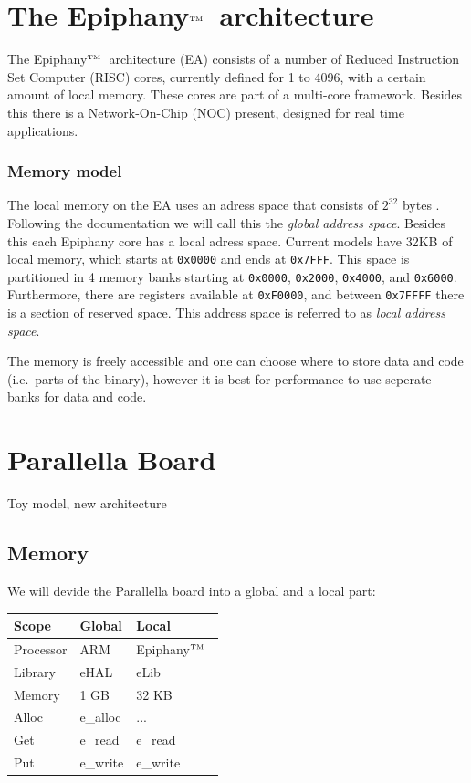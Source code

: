 \documentclass[fleqn]{article}
\renewcommand{\(}{\left(}
\renewcommand{\)}{\right)}
\def\tm{$^{\hbox{\tiny TM}}$~}
\begin{document}
\section{The Epiphany\tm architecture}

The Epiphany\tm architecture (EA) consists of a number of Reduced Instruction Set Computer (RISC) cores, currently defined for 1 to 4096, with a certain amount of local memory. These cores are part of a multi-core framework. Besides this there is a Network-On-Chip (NOC) present, designed for real time applications. 

\subsubsection{Memory model}

The local memory on the EA uses an adress space that consists of $2^{32}$ bytes \cite{ep:sdkdoc}. Following the documentation we will call this the \emph{global address space}. Besides this each Epiphany core has a local adress space. Current models have 32KB of local memory, which starts at \texttt{0x0000} and ends at \texttt{0x7FFF}. This space is partitioned in 4 memory banks starting at \texttt{0x0000}, \texttt{0x2000}, \texttt{0x4000}, and \texttt{0x6000}. Furthermore, there are registers available at \texttt{0xF0000}, and between \texttt{0x7FFFF} there is a section of reserved space. This address space is referred to as \emph{local address space}.



The memory is freely accessible and one can choose where to store data and code (i.e.\ parts of the binary), however it is best for performance to use seperate banks for data and code.

\section{Parallella Board}

Toy model, new architecture

\subsection{Memory}

We will devide the Parallella board into a global and a local part:

\begin{tabular}{l|ll}
Scope & Global & Local \\
\hline
Processor & ARM & Epiphany\tm \\
Library & eHAL & eLib \\
Memory & 1 GB & 32 KB \\
Alloc & e\_alloc & ... \\
Get & e\_read & e\_read \\
Put & e\_write & e\_write \\

\end{tabular}
\end{document}
